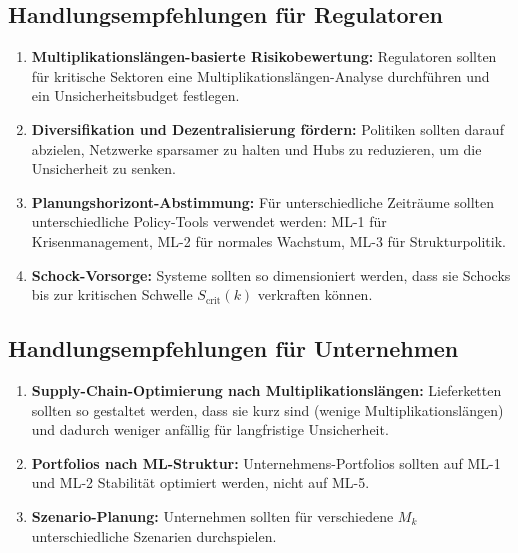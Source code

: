 \documentclass[a4paper,12pt]{article}
\theoremstyle{definition}
\begin{document}
\subsection{Handlungsempfehlungen für Regulatoren}

\begin{enumerate}

\item \textbf{Multiplikationslängen-basierte Risikobewertung:} Regulatoren sollten für kritische Sektoren eine Multiplikationslängen-Analyse durchführen und ein Unsicherheitsbudget festlegen.

\item \textbf{Diversifikation und Dezentralisierung fördern:} Politiken sollten darauf abzielen, Netzwerke sparsamer zu halten und Hubs zu reduzieren, um die Unsicherheit zu senken.

\item \textbf{Planungshorizont-Abstimmung:} Für unterschiedliche Zeiträume sollten unterschiedliche Policy-Tools verwendet werden: ML-1 für Krisenmanagement, ML-2 für normales Wachstum, ML-3 für Strukturpolitik.

\item \textbf{Schock-Vorsorge:} Systeme sollten so dimensioniert werden, dass sie Schocks bis zur kritischen Schwelle $S_{\text{crit}}(k)$ verkraften können.

\end{enumerate}

\subsection{Handlungsempfehlungen für Unternehmen}

\begin{enumerate}

\item \textbf{Supply-Chain-Optimierung nach Multiplikationslängen:} Lieferketten sollten so gestaltet werden, dass sie kurz sind (wenige Multiplikationslängen) und dadurch weniger anfällig für langfristige Unsicherheit.

\item \textbf{Portfolios nach ML-Struktur:} Unternehmens-Portfolios sollten auf ML-1 und ML-2 Stabilität optimiert werden, nicht auf ML-5.

\item \textbf{Szenario-Planung:} Unternehmen sollten für verschiedene $M_k$ unterschiedliche Szenarien durchspielen.

\end{enumerate}
\end{document}
